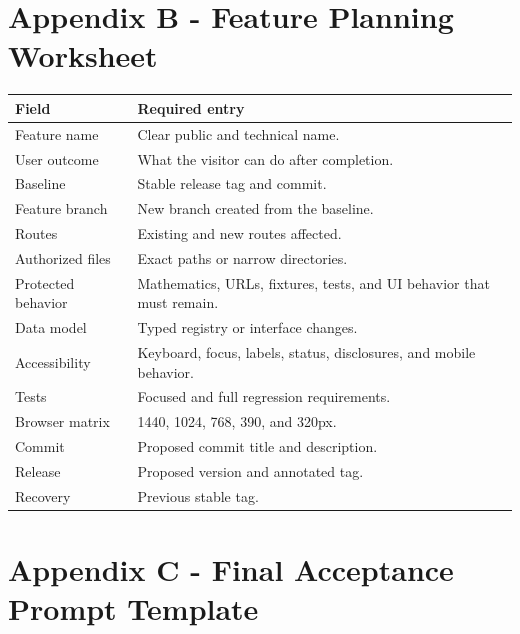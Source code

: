 \documentclass[11pt,letterpaper]{article}
\begin{document}
\section{Appendix B - Feature Planning Worksheet}

\begin{longtable}{L{1.8in}L{4.6in}}
\toprule
\textbf{Field} & \textbf{Required entry} \\
\midrule
Feature name & Clear public and technical name. \\
User outcome & What the visitor can do after completion. \\
Baseline & Stable release tag and commit. \\
Feature branch & New branch created from the baseline. \\
Routes & Existing and new routes affected. \\
Authorized files & Exact paths or narrow directories. \\
Protected behavior & Mathematics, URLs, fixtures, tests, and UI behavior that must remain. \\
Data model & Typed registry or interface changes. \\
Accessibility & Keyboard, focus, labels, status, disclosures, and mobile behavior. \\
Tests & Focused and full regression requirements. \\
Browser matrix & 1440, 1024, 768, 390, and 320px. \\
Commit & Proposed commit title and description. \\
Release & Proposed version and annotated tag. \\
Recovery & Previous stable tag. \\
\bottomrule
\end{longtable}

\section{Appendix C - Final Acceptance Prompt Template}
\end{document}
